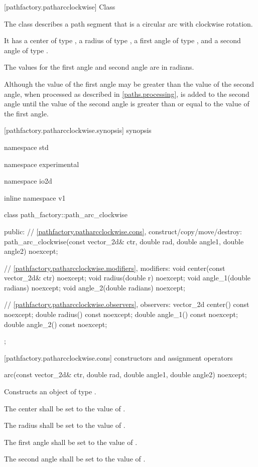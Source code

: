  [pathfactory.patharcclockwise] {Class }

\pnum
{}
The class  describes a path segment that is a circular arc with clockwise rotation.

\pnum
It has a center of type , a radius of type , a first angle of type , and a second angle of type .

\pnum
The values for the first angle and second angle are in radians.

\pnum
\enternote
Although the value of the first angle may be greater than the value of the second angle, when processed as described in \ref{paths.processing},  is added to the second angle until the value of the second angle is greater than or equal to the value of the first angle.
\exitnote

 [pathfactory.patharcclockwise.synopsis] { synopsis}

\begin{codeblock}
namespace std { namespace experimental { namespace io2d { inline namespace v1 {
  class path_factory::path_arc_clockwise {
  public:
    // \ref{pathfactory.patharcclockwise.cons}, construct/copy/move/destroy:
    path_arc_clockwise(const vector_2d& ctr, double rad, double angle1,
      double angle2) noexcept;

    // \ref{pathfactory.patharcclockwise.modifiers}, modifiers:
    void center(const vector_2d& ctr) noexcept;
    void radius(double r) noexcept;
    void angle_1(double radians) noexcept;
    void angle_2(double radians) noexcept;

    // \ref{pathfactory.patharcclockwise.observers}, observers:
    vector_2d center() const noexcept;
    double radius() const noexcept;
    double angle_1() const noexcept;
    double angle_2() const noexcept;
  };
} } } }
\end{codeblock}

 [pathfactory.patharcclockwise.cons] { constructors and assignment operators}

\begin{itemdecl}
    arc(const vector_2d& ctr, double rad, double angle1, double angle2)
      noexcept;
\end{itemdecl}
\begin{itemdescr}
	\pnum
	\effects
	Constructs an object of type .
	
	\pnum
	The center shall be set to the value of .
	
	\pnum
	The radius shall be set to the value of .
	
	\pnum
	The first angle shall be set to the value of .
	
	\pnum
	The second angle shall be set to the value of .
\end{itemdescr}

